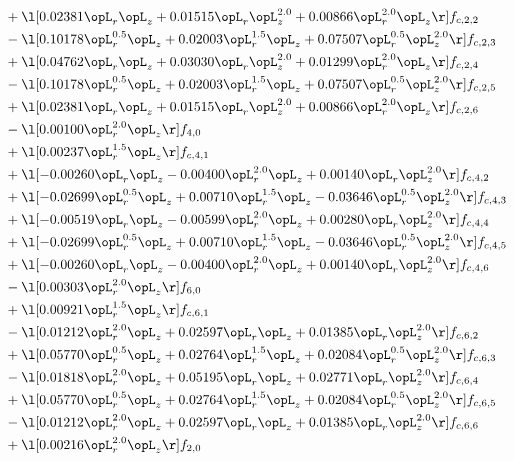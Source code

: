\begin{alignat}{2}
& + \l[  0.02381 \opL_r \opL_z +  0.01515 \opL_r \opL_z^{2.0} +  0.00866 \opL_r^{2.0} \opL_z  \r] f_{c,2,2} \nonumber \\ 
& - \l[  0.10178 \opL_r^{0.5} \opL_z +  0.02003 \opL_r^{1.5} \opL_z +  0.07507 \opL_r^{0.5} \opL_z^{2.0}  \r] f_{c,2,3} \nonumber \\ 
& + \l[  0.04762 \opL_r \opL_z +  0.03030 \opL_r \opL_z^{2.0} +  0.01299 \opL_r^{2.0} \opL_z  \r] f_{c,2,4} \nonumber \\ 
& - \l[  0.10178 \opL_r^{0.5} \opL_z +  0.02003 \opL_r^{1.5} \opL_z +  0.07507 \opL_r^{0.5} \opL_z^{2.0}  \r] f_{c,2,5} \nonumber \\ 
& + \l[  0.02381 \opL_r \opL_z +  0.01515 \opL_r \opL_z^{2.0} +  0.00866 \opL_r^{2.0} \opL_z  \r] f_{c,2,6} \nonumber \\ 
& - \l[  0.00100 \opL_r^{2.0} \opL_z  \r] f_{4,0} \nonumber \\ 
& + \l[  0.00237 \opL_r^{1.5} \opL_z  \r] f_{c,4,1} \nonumber \\ 
& + \l[  -0.00260 \opL_r \opL_z   -0.00400 \opL_r^{2.0} \opL_z +  0.00140 \opL_r \opL_z^{2.0}  \r] f_{c,4,2} \nonumber \\ 
& + \l[  -0.02699 \opL_r^{0.5} \opL_z +  0.00710 \opL_r^{1.5} \opL_z   -0.03646 \opL_r^{0.5} \opL_z^{2.0}  \r] f_{c,4,3} \nonumber \\ 
& + \l[  -0.00519 \opL_r \opL_z   -0.00599 \opL_r^{2.0} \opL_z +  0.00280 \opL_r \opL_z^{2.0}  \r] f_{c,4,4} \nonumber \\ 
& + \l[  -0.02699 \opL_r^{0.5} \opL_z +  0.00710 \opL_r^{1.5} \opL_z   -0.03646 \opL_r^{0.5} \opL_z^{2.0}  \r] f_{c,4,5} \nonumber \\ 
& + \l[  -0.00260 \opL_r \opL_z   -0.00400 \opL_r^{2.0} \opL_z +  0.00140 \opL_r \opL_z^{2.0}  \r] f_{c,4,6} \nonumber \\ 
& - \l[  0.00303 \opL_r^{2.0} \opL_z  \r] f_{6,0} \nonumber \\ 
& + \l[  0.00921 \opL_r^{1.5} \opL_z  \r] f_{c,6,1} \nonumber \\ 
& - \l[  0.01212 \opL_r^{2.0} \opL_z +  0.02597 \opL_r \opL_z +  0.01385 \opL_r \opL_z^{2.0}  \r] f_{c,6,2} \nonumber \\ 
& + \l[  0.05770 \opL_r^{0.5} \opL_z +  0.02764 \opL_r^{1.5} \opL_z +  0.02084 \opL_r^{0.5} \opL_z^{2.0}  \r] f_{c,6,3} \nonumber \\ 
& - \l[  0.01818 \opL_r^{2.0} \opL_z +  0.05195 \opL_r \opL_z +  0.02771 \opL_r \opL_z^{2.0}  \r] f_{c,6,4} \nonumber \\ 
& + \l[  0.05770 \opL_r^{0.5} \opL_z +  0.02764 \opL_r^{1.5} \opL_z +  0.02084 \opL_r^{0.5} \opL_z^{2.0}  \r] f_{c,6,5} \nonumber \\ 
& - \l[  0.01212 \opL_r^{2.0} \opL_z +  0.02597 \opL_r \opL_z +  0.01385 \opL_r \opL_z^{2.0}  \r] f_{c,6,6} \nonumber \\ 
& + \l[  0.00216 \opL_r^{2.0} \opL_z  \r] f_{2,0} \nonumber \\ 
\end{alignat} 


